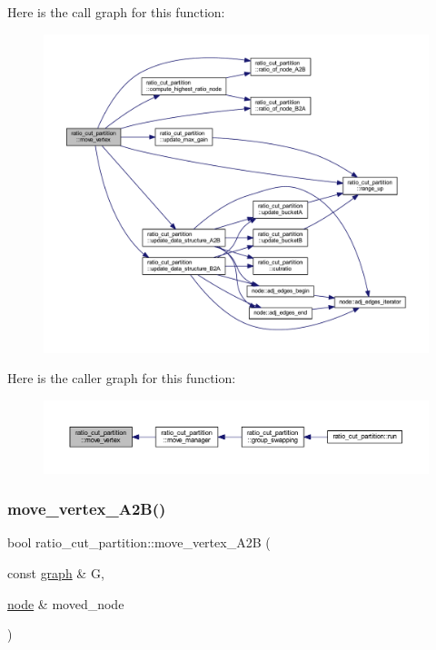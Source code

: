 Here is the call graph for this function\+:\nopagebreak
\begin{figure}[H]
\begin{center}
\leavevmode
\includegraphics[width=350pt]{classratio__cut__partition_a2dbe8b4e73ac88fe6a9a2403ca35eb3f_cgraph}
\end{center}
\end{figure}
Here is the caller graph for this function\+:\nopagebreak
\begin{figure}[H]
\begin{center}
\leavevmode
\includegraphics[width=350pt]{classratio__cut__partition_a2dbe8b4e73ac88fe6a9a2403ca35eb3f_icgraph}
\end{center}
\end{figure}
\mbox{\label{classratio__cut__partition_a8988d72cd456e79243f0e1c1b03ed501}} 
\subsubsection{\texorpdfstring{move\+\_\+vertex\+\_\+\+A2\+B()}{move\_vertex\_A2B()}}
{\footnotesize\ttfamily bool ratio\+\_\+cut\+\_\+partition\+::move\+\_\+vertex\+\_\+\+A2B (\begin{DoxyParamCaption}\item[{const \mbox{\hyperlink{classgraph}{graph}} \&}]{G,  }\item[{\mbox{\hyperlink{classnode}{node}} \&}]{moved\+\_\+node }\end{DoxyParamCaption})\hspace{0.3cm}{\ttfamily [protected]}}



